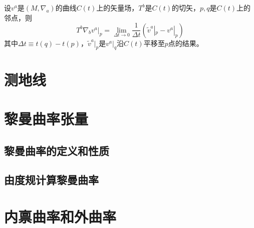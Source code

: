 \begin{theorem}
设$v^a$是$(M, \nabla_a)$的曲线$C(t)$上的矢量场，$T^b$是$C(t)$的切矢，$p, q$是$C(t)$上的邻点，则
$$T^b\nabla_bv^a|_p = \lim_{\Delta t \to 0}\frac{1}{\Delta t}(\tilde v^a|_p - v^a|_p)$$
其中$\Delta t \equiv t(q) - t(p)$，$\tilde v^a|_p$是$v^a|_q$沿$C(t)$平移至$p$点的结果。
\end{theorem}

\section{测地线}

\section{黎曼曲率张量}

\subsection{黎曼曲率的定义和性质}

\subsection{由度规计算黎曼曲率}

\section{内禀曲率和外曲率}

